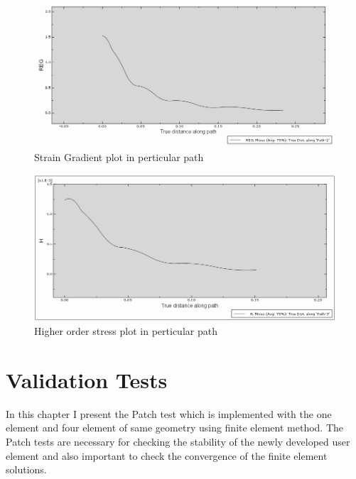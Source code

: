 \documentclass[12pt]{article}
\begin{document}
\begin{figure}[H]
\advance\leftskip-0.5cm
		\includegraphics[scale=0.58]{path_full_grad_plot.png} 
 
	\caption{Strain Gradient plot in perticular path}
\end{figure}
\begin{figure}[H]
\advance\leftskip-0.5cm
		\includegraphics[scale=0.58]{Higher_order_stress_plot.png} 
 
	\caption{Higher order stress plot in perticular path}
\end{figure}
\newpage
\section{Validation Tests}
In this chapter I present the Patch test which is implemented with the one element and four element of same geometry using finite element method. The Patch tests are necessary for checking the stability of the newly developed user element and also important to check the convergence of the finite element solutions.  
\\
\end{document}
